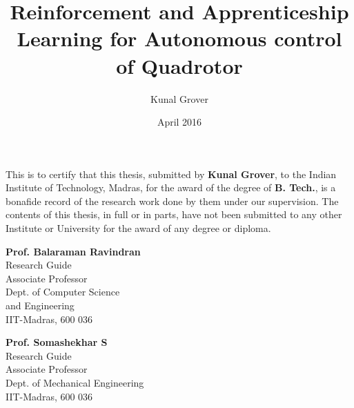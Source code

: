 \documentclass[hidelinks,BTech]{iitmdiss}
\begin{document}
\graphicspath{{images/}	}

\title{Reinforcement and Apprenticeship Learning for Autonomous control of Quadrotor}

\author{Kunal Grover}

\date{April 2016}

\maketitle

\certificate

\vspace*{0.5in}

\noindent This is to certify that this thesis, submitted by {\bf Kunal Grover}, to the Indian Institute of Technology, Madras, for the award of the degree of {\bf B. Tech.}, is a bonafide record of the research work done by them under our supervision. The contents of this thesis, in full or in parts, have not been submitted to any other Institute or University for the award of any degree or diploma.

\vspace*{1.5in}

\begin{singlespacing}

\begin{minipage}[t]{0.45\textwidth}
  {\bf Prof. Balaraman Ravindran} \\
  Research Guide \\
  Associate Professor \\
  Dept. of Computer Science \\
  and Engineering \\
  IIT-Madras, 600 036
\end{minipage}
\hfill
\begin{minipage}[t]{0.45\textwidth}
  {\bf Prof. Somashekhar S} \\
  Research Guide \\
  Associate Professor \\
  Dept. of Mechanical Engineering \\
  IIT-Madras, 600 036
\end{minipage}

\end{singlespacing}
\end{document}
